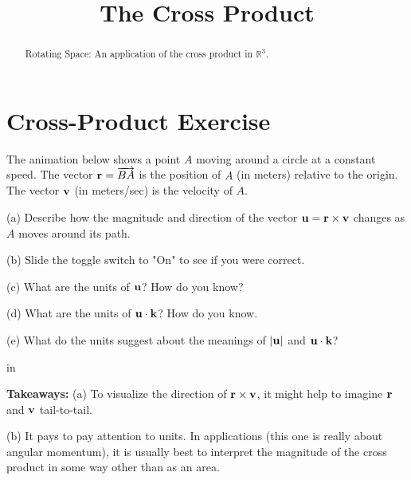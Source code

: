 \documentclass{ximera}
\title{The Cross Product}
\newcommand{\pskip}{\vskip 0.1 in}
\begin{document}
\begin{abstract}
Rotating Space: An application of the cross product in $\mathbb{R}^3$.
\end{abstract}
\maketitle


\section{Cross-Product Exercise}
The animation below shows a point $A$ moving around a circle at a constant speed. The vector ${\bf r} = \overrightarrow{BA}$ is the position of $A$ (in meters) relative to the origin. The vector ${\bf v}$ (in meters/sec) is the velocity of $A$. 

(a) Describe how the magnitude and direction of the vector ${\bf u} = {\bf r}\times {\bf v}$ changes as $A$ moves around its path.

(b) Slide the toggle switch to "On" to see if you were correct.

(c) What are the units of ${\bf u}$? How do you know?

(d) What are the units of ${\bf u} \cdot {\bf k}$? How do you know.

(e) What do the units suggest about the meanings of $|{\bf u}|$ and ${\bf u} \cdot {\bf k}$?

\pskip

{\bf Takeaways:} (a) To visualize the direction of ${\bf r}\times {\bf v}$, it might help to imagine ${\bf r}$ and ${\bf v}$ tail-to-tail.

(b) It pays to pay attention to units. In applications (this one is really about angular momentum), it is usually best to interpret the magnitude of the cross product in some way other than as an area.


\begin{exploration}   \label{Exsd67g:Cross}
 
\begin{onlineOnly}
    \begin{center}
\end{center}
\end{onlineOnly}

\end{exploration}
\end{document}
